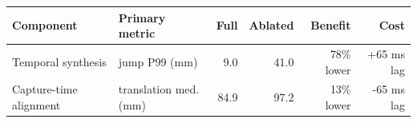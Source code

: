 \begin{tabular}{llrrrr}
\toprule
Component & Primary metric & Full & Ablated & Benefit & Cost \\
\midrule
Temporal synthesis & jump P99 (mm) & 9.0 & 41.0 & 78\% lower & +65 ms lag \\
Capture-time alignment & translation med. (mm) & 84.9 & 97.2 & 13\% lower & -65 ms lag \\
\bottomrule
\end{tabular}

